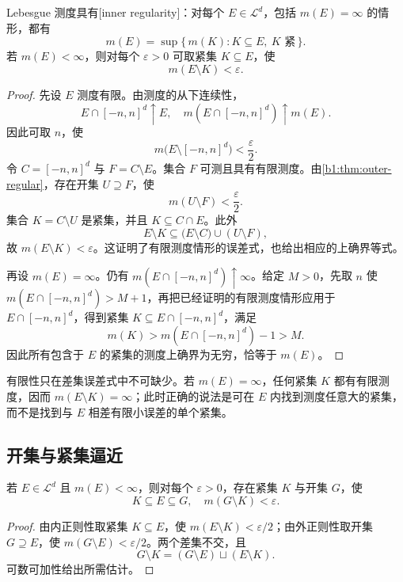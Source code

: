 \begin{theorem}
\label{b1:thm:inner-regular}
Lebesgue 测度具有[inner regularity]：对每个 \(E\in\mathcal L^d\)，包括 \(m(E)=\infty\) 的情形，都有
\[
m(E)=\sup\{\,m(K):K\subseteq E,\ K\text{ 紧}\,\}.
\]
若 \(m(E)<\infty\)，则对每个 \(\varepsilon>0\) 可取紧集 \(K\subseteq E\)，使
\[
m(E\setminus K)<\varepsilon.
\]
\end{theorem}
\begin{proof}
先设 \(E\) 测度有限。由测度的从下连续性，
\[
E\cap[-n,n]^d\uparrow E,
\quad
m(E\cap[-n,n]^d)\uparrow m(E).
\]
因此可取 \(n\)，使
\[
m\bigl(E\setminus[-n,n]^d\bigr)<\frac{\varepsilon}{2}.
\]
令 \(C=[-n,n]^d\) 与 \(F=C\setminus E\)。集合 \(F\) 可测且具有有限测度。由\cref{b1:thm:outer-regular}，存在开集 \(U\supseteq F\)，使
\[
m(U\setminus F)<\frac{\varepsilon}{2}.
\]
集合 \(K=C\setminus U\) 是紧集，并且 \(K\subseteq C\cap E\)。此外
\[
E\setminus K
\subseteq
\bigl(E\setminus C\bigr)\cup(U\setminus F),
\]
故 \(m(E\setminus K)<\varepsilon\)。这证明了有限测度情形的误差式，也给出相应的上确界等式。

再设 \(m(E)=\infty\)。仍有
\(m(E\cap[-n,n]^d)\uparrow\infty\)。给定 \(M>0\)，先取 \(n\) 使
\(m(E\cap[-n,n]^d)>M+1\)，再把已经证明的有限测度情形应用于 \(E\cap[-n,n]^d\)，得到紧集 \(K\subseteq E\cap[-n,n]^d\)，满足
\[
m(K)>m(E\cap[-n,n]^d)-1>M.
\]
因此所有包含于 \(E\) 的紧集的测度上确界为无穷，恰等于 \(m(E)\)。
\end{proof}

有限性只在差集误差式中不可缺少。若 \(m(E)=\infty\)，任何紧集 \(K\) 都有有限测度，因而 \(m(E\setminus K)=\infty\)；此时正确的说法是可在 \(E\) 内找到测度任意大的紧集，而不是找到与 \(E\) 相差有限小误差的单个紧集。

\subsection{开集与紧集逼近}
\label{b1:subsec:030303}

\begin{proposition}
\label{b1:prop:open-compact-sandwich}
若 \(E\in\mathcal L^d\) 且 \(m(E)<\infty\)，则对每个 \(\varepsilon>0\)，存在紧集 \(K\) 与开集 \(G\)，使
\[
K\subseteq E\subseteq G,
\quad
m(G\setminus K)<\varepsilon.
\]
\end{proposition}
\begin{proof}
由内正则性取紧集 \(K\subseteq E\)，使 \(m(E\setminus K)<\varepsilon/2\)；由外正则性取开集 \(G\supseteq E\)，使 \(m(G\setminus E)<\varepsilon/2\)。两个差集不交，且
\[
G\setminus K=(G\setminus E)\sqcup(E\setminus K).
\]
可数可加性给出所需估计。
\end{proof}

